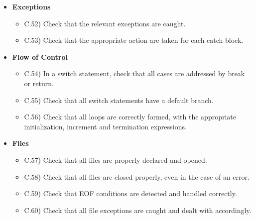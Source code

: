 \documentclass[../../codeInspection.tex]{subfiles}
\begin{document}
\begin{itemize}
\begin{itemize}
						\end{itemize}

				\item 	\textbf{Exceptions}
						\begin{itemize}

							\item C.52)\label{C:52} Check that the relevant exceptions are caught.

							\item C.53)\label{C:53} Check that the appropriate action are taken for each catch block.

						\end{itemize}

				\item 	\textbf{Flow of Control}
						\begin{itemize}

							\item C.54)\label{C:54} In a switch statement, check that all cases are addressed by break or return.

							\item C.55)\label{C:55} Check that all switch statements have a default branch.

							\item C.56)\label{C:56} Check that all loops are correctly formed, with the appropriate initialization, increment and termination expressions.

						\end{itemize}

				\item 	\textbf{Files}
						\begin{itemize}

							\item C.57)\label{C:57} Check that all files are properly declared and opened.

							\item C.58)\label{C:58} Check that all files are closed properly, even in the case of an error.

							\item C.59)\label{C:59} Check that EOF conditions are detected and handled correctly.

							\item C.60)\label{C:60} Check that all file exceptions are caught and dealt with accordingly.
							
						\end{itemize}
			\end{itemize}
\end{document}
